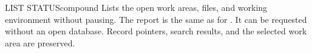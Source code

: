 \begin{XbaseEntry}{LIST STATUS}{compound}
Lists the open work areas, files, and working environment without pausing.
\Syntax
{}
\Usage
The report is the same as for .  It can be requested
without an open database.  Record pointers, search results, and the selected
work area are preserved.
\end{XbaseEntry}

